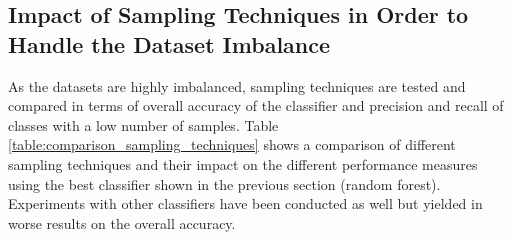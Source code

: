 \subsection{Impact of Sampling Techniques in Order to Handle the Dataset Imbalance}

As the datasets are highly imbalanced, sampling techniques are tested and compared in terms of overall accuracy of the classifier and precision and recall of classes with a low number of samples. Table \ref{table:comparison_sampling_techniques} shows a comparison of different sampling techniques and their impact on the different performance measures using the best classifier shown in the previous section (random forest). Experiments with other classifiers have been conducted as well but yielded in worse results on the overall accuracy.

\begin{table}


\caption{Comparison of different sampling techniques and their effect on the performance of a random forest classifier on the filtered dataset.}
\label{table:comparison_sampling_techniques}
\end{table}

